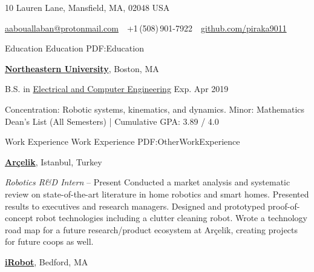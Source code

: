\documentclass[letterpaper,MMMyyyy,nonstopmode]{simpleresumecv}
\newcommand{\CVAuthor}{Anas Abou Allaban}
\newcommand{\CVWebpage}{github.com/piraka9011}
\begin{document}

\Title{\CVAuthor}

\begin{SubTitle}
10 Lauren Lane, Mansfield, MA, 02048 USA
\par
\href{mailto:aabouallaban@protonmail.com}
{aabouallaban@protonmail.com}
\,\SubBulletSymbol\,
+1\,(508)\,901-7922
\,\SubBulletSymbol\,
\href{\CVWebpage}
{\url{\CVWebpage}}
\end{SubTitle}

\begin{Body}


\Section
{Education}
{Education}
{PDF:Education}


\Entry
\href{http://www.northeastern.edu}
{\textbf{Northeastern University}},
Boston, MA

\Gap
B.S. in 
\href{http://www.ece.neu.edu/}
{Electrical and Computer Engineering}
\hfill
Exp. Apr 2019
\begin{Detail}
\SubBulletItem
Concentration: Robotic systems, kinematics, and dynamics.
\SubBulletItem
Minor: Mathematics
\SubBulletItem
Dean's List (All Semesters) | Cumulative GPA: 3.89 / 4.0
\end{Detail}


\Section
{Work Experience}
{Work Experience}
{PDF:OtherWorkExperience}


\Entry
\href{http://www.arcelikas.com/page/69/Technology_and_Innovation}
{\textbf{Ar\c{c}elik}}, 
Istanbul, Turkey

\Gap
\textit{Robotics R\&D Intern}
\hfill
{} -- Present
\BulletItem
Conducted a market analysis and systematic review on state-of-the-art literature in home robotics and smart homes. Presented results to executives and research managers.
\BulletItem
Designed and prototyped proof-of-concept robot technologies including a clutter cleaning robot.
\BulletItem
Wrote a technology road map for a future research/product ecosystem at Ar\c{c}elik, creating projects for future coops as well.
\SectionSpace


\Entry
\href{http://www.irobot.com}
{\textbf{iRobot}},
Bedford, MA


\end{Body}
\end{document}
